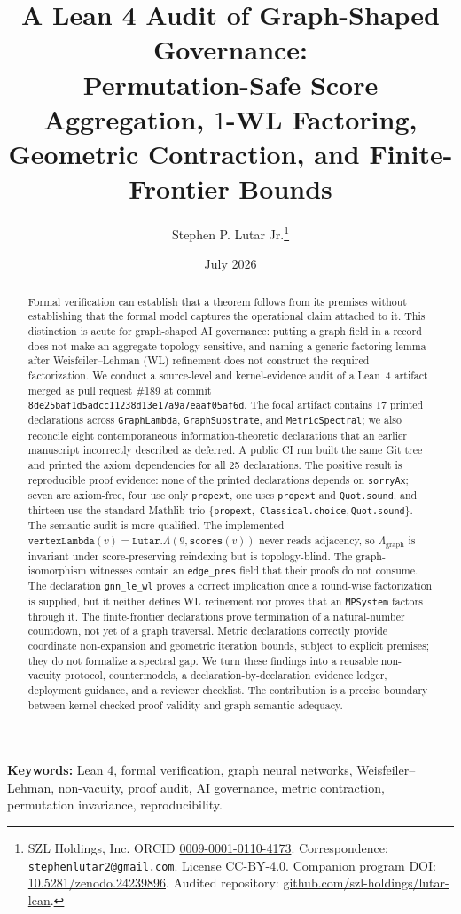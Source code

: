 \documentclass[10pt,letterpaper]{article}
\title{\textbf{A Lean 4 Audit of Graph-Shaped Governance:}\\
Permutation-Safe Score Aggregation, \(1\)-WL Factoring,\\
Geometric Contraction, and Finite-Frontier Bounds}
\author{Stephen P. Lutar Jr.\thanks{SZL Holdings, Inc. ORCID
  \href{https://orcid.org/0009-0001-0110-4173}{0009-0001-0110-4173}.
  Correspondence: \texttt{stephenlutar2@gmail.com}. License CC-BY-4.0.
  Companion program DOI:
  \href{https://doi.org/10.5281/zenodo.24239896}{10.5281/zenodo.24239896}.
  Audited repository:
  \href{https://github.com/szl-holdings/lutar-lean}{github.com/szl-holdings/lutar-lean}.}}
\date{July 2026}
\theoremstyle{definition}
\newcommand{\Lam}{\Lambda}
\newcommand{\Lgraph}{\Lambda_{\mathrm{graph}}}
\newcommand{\coretrio}{\{\texttt{propext},\,\allowbreak
  \texttt{Classical.choice},\,\allowbreak\texttt{Quot.sound}\}}
\newcommand{\sha}[2]{\texttt{#1}\allowbreak\texttt{#2}}
\newcommand{\commit}{\sha{8de25baf1d5adcc11238}{d13e17a9a7eaaf05af6d}}
\begin{document}
\maketitle
\begin{abstract}
Formal verification can establish that a theorem follows from its premises
without establishing that the formal model captures the operational claim
attached to it. This distinction is acute for graph-shaped AI governance:
putting a graph field in a record does not make an aggregate topology-sensitive,
and naming a generic factoring lemma after Weisfeiler--Lehman (WL) refinement
does not construct the required factorization. We conduct a source-level and
kernel-evidence audit of a Lean~4 artifact merged as pull request \#189 at commit
\commit. The focal artifact contains 17 printed declarations across
\texttt{GraphLambda}, \texttt{GraphSubstrate}, and \texttt{MetricSpectral}; we
also reconcile eight contemporaneous information-theoretic declarations that
an earlier manuscript incorrectly described as deferred. A public CI run built
the same Git tree and printed the axiom dependencies for all 25 declarations.
The positive result is reproducible proof evidence: none of the printed
declarations depends on \texttt{sorryAx}; seven are axiom-free, four use only
\texttt{propext}, one uses \texttt{propext} and \texttt{Quot.sound}, and
thirteen use the standard Mathlib trio \coretrio. The semantic audit is more
qualified. The implemented
\(\texttt{vertexLambda}(v)=\texttt{Lutar.}\Lam(9,\texttt{scores}(v))\) never
reads adjacency, so \(\Lgraph\) is invariant under score-preserving
reindexing but is topology-blind. The graph-isomorphism witnesses contain an
\texttt{edge\_pres} field that their proofs do not consume. The declaration
\texttt{gnn\_le\_wl} proves a correct implication once a round-wise
factorization is supplied, but it neither defines WL refinement nor proves that
an \texttt{MPSystem} factors through it. The finite-frontier declarations prove
termination of a natural-number countdown, not yet of a graph traversal.
Metric declarations correctly provide coordinate non-expansion and geometric
iteration bounds, subject to explicit premises; they do not formalize a
spectral gap. We turn these findings into a reusable non-vacuity protocol,
countermodels, a declaration-by-declaration evidence ledger, deployment
guidance, and a reviewer checklist. The contribution is a precise boundary
between kernel-checked proof validity and graph-semantic adequacy.
\end{abstract}
\noindent\textbf{Keywords:} Lean 4, formal verification, graph neural networks,
Weisfeiler--Lehman, non-vacuity, proof audit, AI governance, metric contraction,
permutation invariance, reproducibility.
\end{document}
